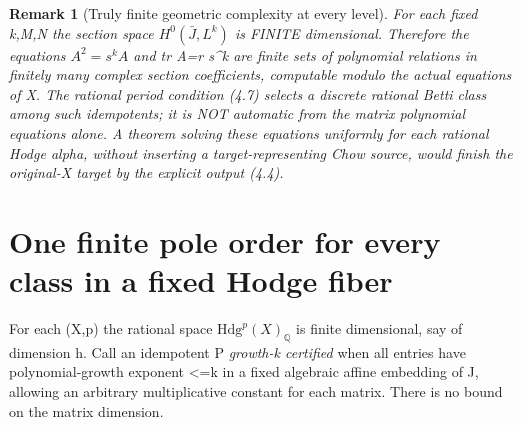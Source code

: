\documentclass[11pt]{article}
\newtheorem{remark}[theorem]{Remark}
\begin{document}
\begin{remark}[Truly finite geometric complexity at every level]
For each fixed k,M,N the section
space $H^0(\bar J,L^k)$ is FINITE
dimensional. Therefore the equations
$A^2=s^kA$ and tr A=r s^k
are finite sets of polynomial
relations in finitely many complex
section coefficients, computable
modulo the actual equations of X.
The rational period condition (4.7)
selects a discrete rational Betti
class among such idempotents; it
is NOT automatic from the matrix
polynomial equations alone.
A theorem solving these equations
uniformly for each rational Hodge
alpha, without inserting a
target-representing Chow source,
would finish the original-X target
by the explicit output (4.4).
\end{remark}

\section{One finite pole order for every class in a fixed Hodge fiber}
For each (X,p) the rational space
$\mathrm{Hdg}^p(X)_{\mathbb Q}$ is finite
dimensional, say of dimension h.
Call an idempotent P \emph{growth-k
certified} when all entries have
polynomial-growth exponent <=k in
a fixed algebraic affine embedding
of J, allowing an arbitrary multiplicative
constant for each matrix. There is no
bound on the matrix dimension.
\end{document}
